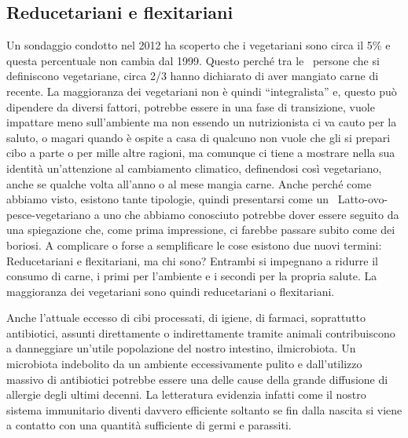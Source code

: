 \documentclass[12pt]{book} %
\begin{document}
\clearpage\subsection{Reducetariani e flexitariani}
Un sondaggio condotto nel
2012 ha scoperto che i vegetariani sono circa il 5\% e questa percentuale non cambia dal 1999. Questo perché tra le
\ persone che si definiscono vegetariane, circa 2/3 hanno dichiarato di aver mangiato carne di recente. La maggioranza
dei vegetariani non è quindi “integralista” e, questo può dipendere da diversi fattori, potrebbe essere in una fase di
transizione, vuole impattare meno sull'ambiente ma non essendo un nutrizionista ci va cauto per la
saluto, o magari quando è ospite a casa di qualcuno non vuole che gli si prepari cibo a parte o per mille altre
ragioni, ma comunque ci tiene a mostrare nella sua identità un'attenzione al cambiamento
climatico, definendosi così vegetariano, anche se qualche volta all'anno o al mese mangia carne. Anche perché come
abbiamo visto, esistono tante tipologie, quindi presentarsi come un \ Latto-ovo-pesce-vegetariano a uno che abbiamo
conosciuto potrebbe dover essere seguito da una spiegazione che, come prima impressione, ci farebbe passare subito come
dei boriosi. A complicare o forse a semplificare le cose esistono due nuovi termini: Reducetariani e flexitariani, ma
chi sono? Entrambi si impegnano a ridurre il consumo di carne, i primi per l'ambiente e i secondi
per la propria salute. La maggioranza dei vegetariani sono quindi reducetariani o flexitariani. 


\bigskip
\begin{mdframed}[linewidth=1pt]
Anche l'attuale eccesso di cibi processati, di igiene, di farmaci, soprattutto antibiotici, assunti
direttamente o indirettamente tramite animali contribuiscono a danneggiare un'utile popolazione
del nostro intestino, ilmicrobiota. Un microbiota indebolito da un ambiente eccessivamente pulito e
dall'utilizzo massivo di antibiotici potrebbe essere una delle cause della grande diffusione di
allergie degli ultimi decenni. La letteratura evidenzia infatti come il nostro sistema immunitario diventi davvero
efficiente soltanto se fin dalla nascita si viene a contatto con una quantità sufficiente di germi e parassiti. 
\end{mdframed}

\bigskip
\end{document}

